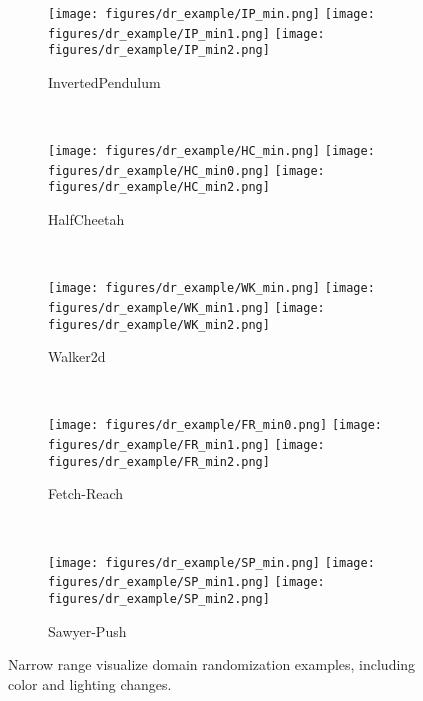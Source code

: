 \begin{figure}[t]
    \centering
    \begin{subfigure}[t]{\linewidth}
        \centering
        \texttt{[image: figures/dr\_example/IP\_min.png]}
        \texttt{[image: figures/dr\_example/IP\_min1.png]}
        \texttt{[image: figures/dr\_example/IP\_min2.png]}
        \caption{InvertedPendulum}
    \end{subfigure}
    \\
    \begin{subfigure}[t]{\linewidth}
        \centering
        \texttt{[image: figures/dr\_example/HC\_min.png]}
        \texttt{[image: figures/dr\_example/HC\_min0.png]}
        \texttt{[image: figures/dr\_example/HC\_min2.png]}
        \caption{HalfCheetah}
    \end{subfigure}
    \\
    \begin{subfigure}[t]{\linewidth}
        \centering
        \texttt{[image: figures/dr\_example/WK\_min.png]}
        \texttt{[image: figures/dr\_example/WK\_min1.png]}
        \texttt{[image: figures/dr\_example/WK\_min2.png]}
        \caption{Walker2d}
    \end{subfigure}
    \\
    \begin{subfigure}[t]{\linewidth}
        \centering
        \texttt{[image: figures/dr\_example/FR\_min0.png]}
        \texttt{[image: figures/dr\_example/FR\_min1.png]}
        \texttt{[image: figures/dr\_example/FR\_min2.png]}
        \caption{Fetch-Reach}
    \end{subfigure}
    \\
    \begin{subfigure}[t]{\linewidth}
        \centering
        \texttt{[image: figures/dr\_example/SP\_min.png]}
        \texttt{[image: figures/dr\_example/SP\_min1.png]}
        \texttt{[image: figures/dr\_example/SP\_min2.png]}
        \caption{Sawyer-Push}
    \end{subfigure}
    \caption{
        Narrow range visualize domain randomization examples, including color and lighting changes.
    }
    \label{fig:dr_visual_narrow}
\end{figure}

